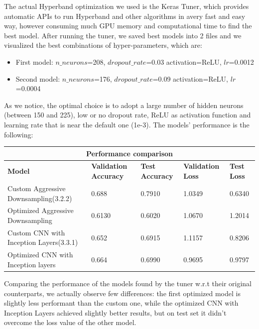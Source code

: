 The actual Hyperband optimization we used is the Keras Tuner, which provides automatic APIs to run Hyperband and other algorithms in avery fast and easy way, however consuming much GPU memory and computational time to find the best model. After running the tuner, we saved best models into 2 files and we visualized the best combinations of hyper-parameters, which are:
\begin{itemize}
\item First model: $n\_neurons$=208, $dropout\_rate$=0.03 activation=ReLU, $lr$=0.0012
\item Second model: $n\_neurons$=176, $dropout\_rate$=0.09 activation=ReLU, $lr$=0.0004
\end{itemize}

\noindent As we notice, the optimal choice is to adopt a large number of hidden neurons (between 150 and 225), low or no dropout rate, ReLU as activation function and learning rate that is near the default one (1e-3). The models' performance is the following:


\begin{tabular}{ |p{5cm}|p{2cm}|p{2cm}|p{2cm}|p{2cm}|  }
\hline
\multicolumn{5}{|c|}{Performance comparison} \\
\hline
\textbf{Model} & \textbf{Validation Accuracy} & \textbf{Test Accuracy} & \textbf{Validation Loss} & \textbf{Test Loss} \\
\hline
Custom Aggressive Downsampling(3.2.2) & 0.688 & 0.7910 & 1.0349 & 0.6340\\
\hline
Optimized Aggressive Downsampling & 0.6130 & 0.6020 & 1.0670 & 1.2014\\
\hline
Custom CNN with Inception Layers(3.3.1) & 0.652 & 0.6915 & 1.1157 & 0.8206\\
\hline
Optimized CNN with Inception layers & 0.664 & 0.6990 & 0.9695 & 0.9797\\
\hline
\end{tabular}

\medskip 

\noindent Comparing the performance of the models found by the tuner w.r.t their original counterparts, we actually observe few differences: the first optimized model is slightly less performant than the custom one, while the optimized CNN with Inception Layers achieved slightly better results, but on test set it didn't overcome the loss value of the other model.

